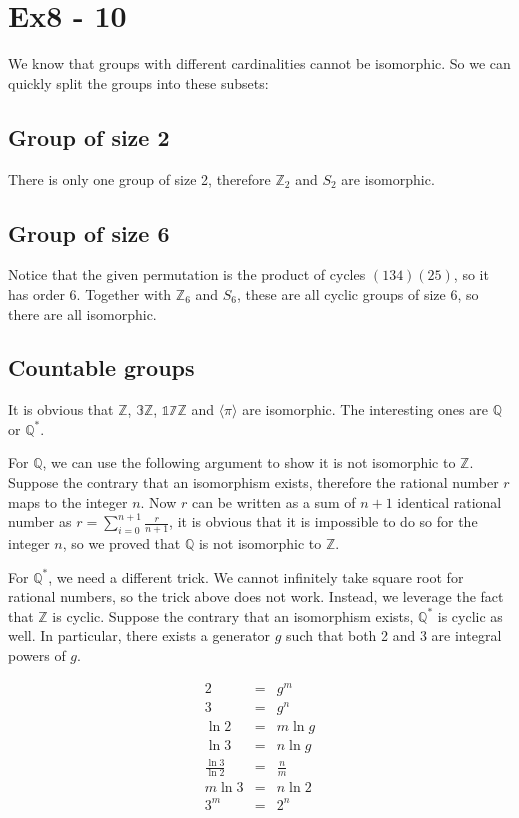 \section*{Ex8 - 10}
We know that groups with different cardinalities cannot be isomorphic. So we can quickly split the groups into these subsets:

\subsection*{Group of size 2}
There is only one group of size 2, therefore $\mathbb{Z}_2 $ and $ S_2 $ are isomorphic.

\subsection*{Group of size 6}
Notice that the given permutation is the product of cycles $ (1 3 4) (2 5) $, so it has order 6. Together with $ \mathbb{Z}_6 $ and $ S_6 $, these are all cyclic groups of size 6, so there are all isomorphic.

\subsection*{Countable groups}
It is obvious that $ \mathbb{Z} $, $ \mathbb{3Z} $, $ \mathbb{17Z} $ and $ \langle \pi \rangle $ are isomorphic. The interesting ones are $ \mathbb{Q} $ or $ \mathbb{Q}^* $. 

For $ \mathbb{Q} $, we can use the following argument to show it is not isomorphic to $ \mathbb{Z} $. Suppose the contrary that an isomorphism exists, therefore the rational number $ r $ maps to the integer $ n $. Now $ r $ can be written as a sum of $ n + 1 $ identical rational number as $ r = \sum\limits_{i = 0}^{n+1}\frac{r}{n + 1} $, it is obvious that it is impossible to do so for the integer $ n $, so we proved that $ \mathbb{Q} $ is not isomorphic to $ \mathbb{Z} $.

For $ \mathbb{Q}^* $, we need a different trick. We cannot infinitely take square root for rational numbers, so the trick above does not work. Instead, we leverage the fact that $ \mathbb{Z} $ is cyclic. Suppose the contrary that an isomorphism exists, $ \mathbb{Q}^* $ is cyclic as well. In particular, there exists a generator $ g $ such that both 2 and 3 are integral powers of $ g $.

\begin{eqnarray*}
                      2 &=& g^m \\
                      3 &=& g^n \\
                  \ln 2 &=& m \ln g \\
                  \ln 3 &=& n \ln g \\
    \frac{\ln 3}{\ln 2} &=& \frac{n}{m} \\
                m \ln 3 &=& n\ln 2 \\
                    3^m &=& 2^n
\end{eqnarray*}

